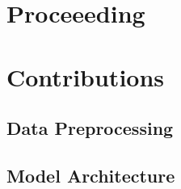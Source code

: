 

\section{Proceeeding}
\label{ch:intro-proceeeding}



\section{Contributions}
\label{ch:intro-contributions}



\subsection{Data Preprocessing}
\label{ch:intro-contributions-dataPreprocessing}


\subsection{Model Architecture} %
\label{ch:intro-contributions-modelArchitecture}

